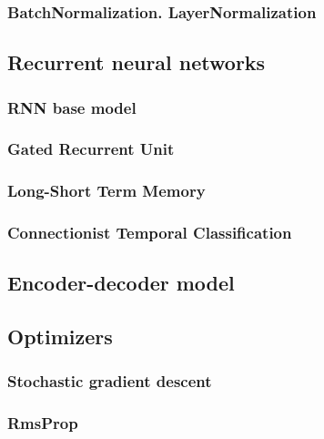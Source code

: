 \subsubsection{BatchNormalization. LayerNormalization}
\label{subsubsec:ch3sec3subsec3subsubsec5}

\subsection{Recurrent neural networks}
\label{subsec:ch3sec3subsec4}

\subsubsection{RNN base model}
\label{subsubsec:ch3sec3subsec4subsubsec1}

\subsubsection{Gated Recurrent Unit}
\label{subsubsec:ch3sec3subsec4subsubsec2}

\subsubsection{Long-Short Term Memory}
\label{subsubsec:ch3sec3subsec4subsubsec3}

\subsubsection{Connectionist Temporal Classification}
\label{subsubsec:ch3sec3subsec4subsubsec4}

\subsection{Encoder-decoder model}
\label{subsec:ch3sec3subsec5}

\subsection{Optimizers}
\label{subsec:ch3sec3subsec6}

\subsubsection{Stochastic gradient descent}
\label{subsubsec:ch3sec3subsec6subsubsec1}

\subsubsection{RmsProp}
\label{subsubsec:ch3sec3subsec6subsubsec2}

